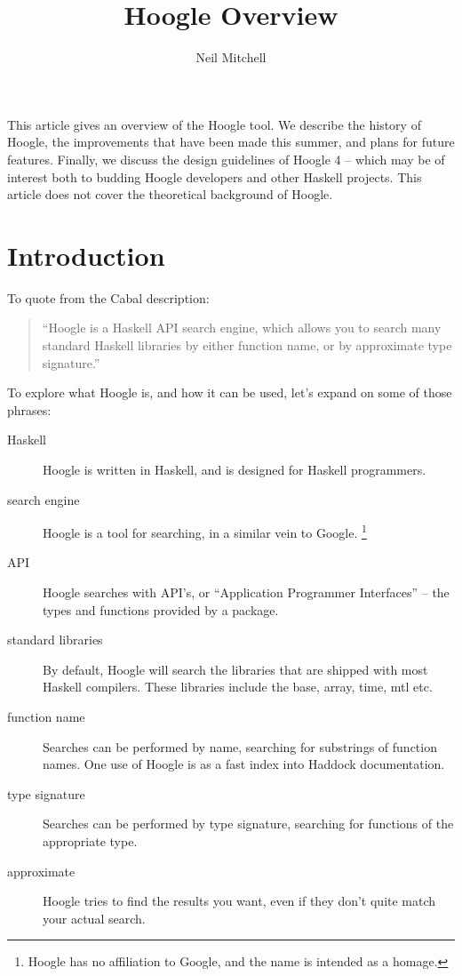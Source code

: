 \documentclass{tmr}
\title{Hoogle Overview}
\author{Neil Mitchell\email{ndmitchell@gmail.com}}
\begin{document}
\begin{introduction}
This article gives an overview of the Hoogle tool. We describe the history of Hoogle, the improvements that have been made this summer, and plans for future features. Finally, we discuss the design guidelines of Hoogle 4 -- which may be of interest both to budding Hoogle developers and other Haskell projects. This article does not cover the theoretical background of Hoogle.
\end{introduction}

\section{Introduction}

To quote from the Cabal description:

\begin{quote}
``Hoogle is a Haskell API search engine, which allows you to search many standard Haskell libraries by either function name, or by approximate type signature.''
\end{quote}

To explore what Hoogle is, and how it can be used, let's expand on some of those phrases:

\begin{description}
\item[Haskell] Hoogle is written in Haskell, and is designed for Haskell programmers.
\item[search engine] Hoogle is a tool for searching, in a similar vein to Google. \footnote{Hoogle has no affiliation to Google, and the name is intended as a homage.}
\item[API] Hoogle searches with API's, or ``Application Programmer Interfaces'' -- the types and functions provided by a package.
\item[standard libraries] By default, Hoogle will search the libraries that are shipped with most Haskell compilers. These libraries include the base, array, time, mtl etc.
\item[function name] Searches can be performed by name, searching for substrings of function names. One use of Hoogle is as a fast index into Haddock documentation.
\item[type signature] Searches can be performed by type signature, searching for functions of the appropriate type.
\item[approximate] Hoogle tries to find the results you want, even if they don't quite match your actual search.
\end{description}
\end{document}
